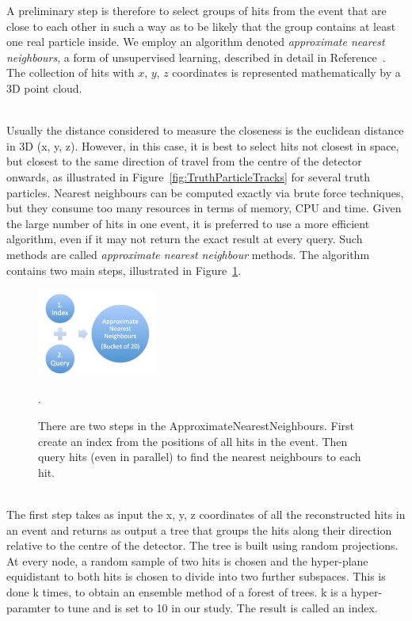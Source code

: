 A preliminary step is therefore to select groups of hits from the event that are close to each other in such a way as to be likely that the group contains at least one real particle inside. We employ an algorithm denoted \emph{approximate nearest neighbours}, a form of unsupervised learning, described in detail in Reference~\cite{BucketCreation}. The collection of hits with $x$, $y$, $z$ coordinates is represented mathematically by a 3D point cloud. 

\ \\Usually the distance considered to measure the closeness is the euclidean distance in 3D (x, y, z). However, in this case, it is best to select hits not closest in space, but closest to the same direction of travel from the centre of the detector onwards, as illustrated in Figure~\ref{fig:TruthParticleTracks} for several truth particles. Nearest neighbours can be computed exactly via brute force techniques, but they consume too many resources in terms of memory, CPU and time. Given the large number of hits in one event, it is preferred to use a more efficient algorithm, even if it may not return the exact result at every query. Such methods are called \emph{approximate nearest neighbour} methods. The algorithm contains two main steps, illustrated in Figure~\ref{fig:ApproximateNearestNeighbours}.

\begin{figure}[htb]
\centering
\includegraphics[width=0.35\textwidth]{./plots/ApproximateNearestNeighbours.jpeg}
\caption{There are two steps in the ApproximateNearestNeighbours. First create an index from the positions of all hits in the event. Then query hits (even in parallel) to find the nearest neighbours to each hit.}
\label{fig:ApproximateNearestNeighbours}.
\end{figure}

\ \\The first step takes as input the x, y, z coordinates of all the reconstructed hits in an event and returns as output a tree that groups the hits along their direction relative to the centre of the detector. The tree is built using random projections. At every node, a random sample of two hits is chosen and the hyper-plane equidistant to both hits is chosen to divide into two further subspaces. This is done k times, to obtain an ensemble method of a forest of trees. k is a hyper-paramter to tune and is set to 10 in our study. The result is called an index. 

